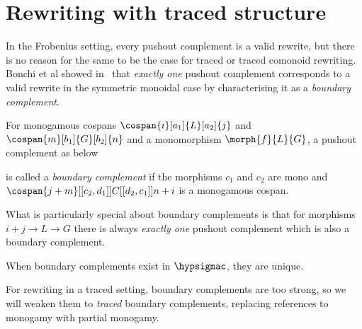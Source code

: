 \section{Rewriting with traced structure}

In the Frobenius setting, every pushout complement is a valid rewrite, but there
is no reason for the same to be the case for traced or traced comonoid
rewriting.
Bonchi et al showed in~\cite{bonchi2022stringa} that \emph{exactly one} pushout
complement corresponds to a valid rewrite in the symmetric monoidal case by
characterising it as a \emph{boundary complement}.

\begin{definition}
    For monogamous cospans \(
    \cospan{i}[a_1]{L}[a_2]{j}
    \) and \(
    \cospan{m}[b_1]{G}[b_2]{n}
    \) and a monomorphism \(\morph{f}{L}{G}\), a pushout complement as below
    \begin{center}
    \end{center}
    is called a \emph{boundary complement} if the morphisms \(c_1\) and \(c_2\) are
    mono and \(
    \cospan{j + m}[[c_2,d_1]]{C}[[d_2,c_1]]{n + i}
    \) is a monogamous cospan.
\end{definition}

What is particularly special about boundary complements is that for morphisms
\(i + j \to L \to G\) there is always \emph{exactly one} pushout
complement which is also a boundary complement.

\begin{proposition}
    When boundary complements exist in \(\hypsigmac\), they are unique.
\end{proposition}

For rewriting in a traced setting, boundary complements are too strong, so we
will weaken them to \emph{traced} boundary complements, replacing references to
monogamy with partial monogamy.

